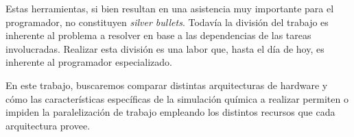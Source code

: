 Estas herramientas, si bien resultan en una asistencia muy importante para el programador, no constituyen \textit{silver bullets}.
Todav\'ia la divisi\'on del trabajo es inherente al problema a resolver en base a las dependencias de las tareas involucradas.
Realizar esta divisi\'on es una labor que, hasta el d\'ia de hoy, es inherente al programador especializado.

En este trabajo, buscaremos comparar distintas arquitecturas de hardware y c\'omo las caracter\'isticas espec\'ificas de la simulaci\'on qu\'imica a realizar permiten o impiden la paralelizaci\'on de trabajo empleando los distintos recursos que cada arquitectura provee.
